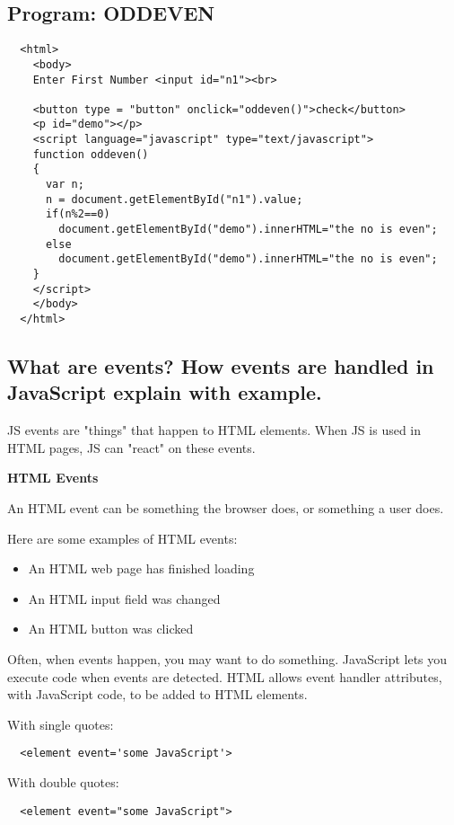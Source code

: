 \documentclass[a4paper]{article}
\begin{document}
  \subsection{Program: ODDEVEN}%
  \begin{lstlisting}
  <html>
    <body>
    Enter First Number <input id="n1"><br>
  
    <button type = "button" onclick="oddeven()">check</button>
    <p id="demo"></p>
    <script language="javascript" type="text/javascript">
    function oddeven()
    {
      var n;
      n = document.getElementById("n1").value;
      if(n%2==0)
        document.getElementById("demo").innerHTML="the no is even";
      else
        document.getElementById("demo").innerHTML="the no is even";
    }
    </script>
    </body>
  </html>
  \end{lstlisting}%

  \subsection{What are events? How events are handled in JavaScript %
  explain with example.}
  JS events are "things" that happen to HTML elements. When JS is 
  used in HTML pages, JS can "react" on these events.

  \begin{center}
    \textbf{HTML Events}
  \end{center}
  An HTML event can be something the browser does, or something 
  a user does.

  Here are some examples of HTML events:
  \begin{itemize}
    \item An HTML web page has finished loading
    \item An HTML input field was changed
    \item An HTML button was clicked
  \end{itemize}
  Often, when events happen, you may want to do something.
  JavaScript lets you execute code when events are detected.
  HTML allows event handler attributes, with JavaScript code,
  to be added to HTML elements.

  With single quotes:

  \begin{lstlisting}
  <element event='some JavaScript'>
  \end{lstlisting}

  With double quotes:

  \begin{lstlisting}
  <element event="some JavaScript">
  \end{lstlisting}
\end{document}

